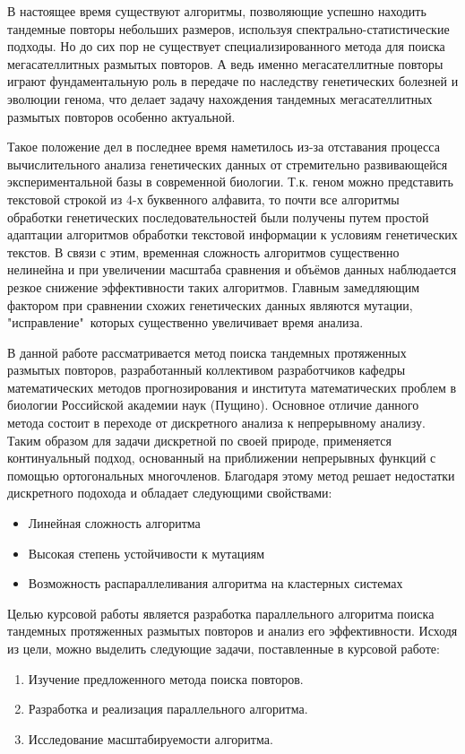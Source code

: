 В настоящее время существуют алгоритмы, позволяющие успешно находить тандемные
повторы небольших размеров, используя спектрально-статистические подходы.
Но до сих пор не существует специализированного метода для поиска мегасателлитных
размытых повторов. А ведь именно мегасателлитные повторы играют фундаментальную
роль в передаче по наследству генетических болезней и эволюции генома, что делает
задачу нахождения тандемных мегасателлитных размытых повторов особенно актуальной.

Такое положение дел в последнее время наметилось из-за отставания
процесса вычислительного анализа генетических данных от стремительно развивающейся
экспериментальной базы в современной биологии. Т.к. геном можно представить
текстовой строкой из 4-х буквенного алфавита, то почти все алгоритмы обработки
генетических последовательностей были получены путем простой адаптации алгоритмов
обработки текстовой информации к условиям генетических текстов. В связи с этим,
временная сложность алгоритмов существенно нелинейна и при увеличении масштаба
сравнения и объёмов данных наблюдается резкое снижение эффективности таких
алгоритмов. Главным замедляющим фактором при сравнении схожих
генетических данных являются мутации, "исправление"\ которых существенно
увеличивает время анализа.

В данной работе рассматривается метод поиска тандемных протяженных размытых
повторов, разработанный коллективом разработчиков кафедры математических методов
прогнозирования и института математических проблем в биологии Российской
академии наук (Пущино). Основное отличие данного метода состоит в переходе
от дискретного анализа к непрерывному анализу. Таким образом для
задачи дискретной по своей природе, применяется континуальный подход, основанный
на приближении непрерывных функций с помощью ортогональных многочленов.
Благодаря этому метод решает недостатки дискретного подохода и обладает
следующими свойствами:
\begin{itemize}
  \item Линейная сложность алгоритма
  \item Высокая степень устойчивости к мутациям
  \item Возможность распараллеливания алгоритма на кластерных системах
\end{itemize}

Целью курсовой работы является разработка параллельного алгоритма поиска
тандемных протяженных размытых повторов и анализ его эффективности. Исходя из
цели, можно выделить следующие задачи, поставленные в курсовой работе:
\begin{enumerate}
  \item Изучение предложенного метода поиска повторов.
  \item Разработка и реализация параллельного алгоритма.
  \item Исследование масштабируемости алгоритма.
\end{enumerate}

\clearpage
